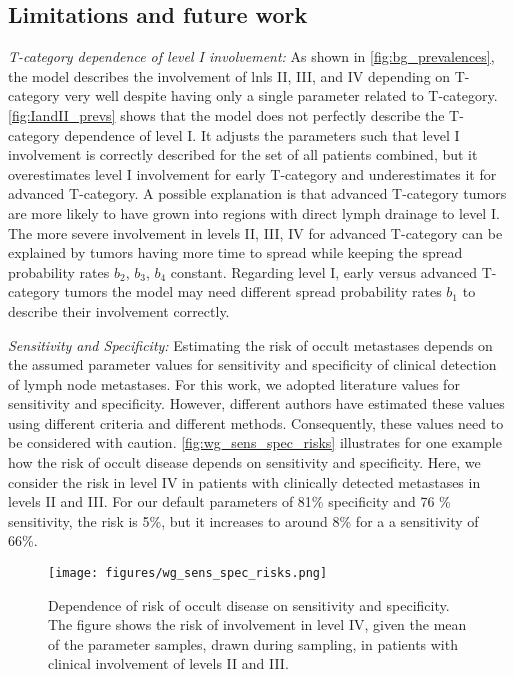 \documentclass[twocolumn]{aastex631}
\begin{document}
\subsection{Limitations and future work}
\label{subsec:disc:limitation}

{\it T-category dependence of level I involvement:} As shown in \autoref{fig:bg_prevalences}, the model describes the involvement of \glspl{lnl} II, III, and IV depending on T-category very well despite having only a single parameter related to T-category. \autoref{fig:IandII_prevs} shows that the model does not perfectly describe the T-category dependence of level I. It adjusts the parameters such that level I involvement is correctly described for the set of all patients combined, but it overestimates level I involvement for early T-category and underestimates it for advanced T-category. A possible explanation is that advanced T-category tumors are more likely to have grown into regions with direct lymph drainage to level I. The more severe involvement in levels II, III, IV for advanced T-category can be explained by tumors having more time to spread while keeping the spread probability rates $b_2$, $b_3$, $b_4$ constant. Regarding level I, early versus advanced T-category tumors the model may need different spread probability rates $b_1$ to describe their involvement correctly.

{\it Sensitivity and Specificity:} Estimating the risk of occult metastases depends on the assumed parameter values for sensitivity and specificity of clinical detection of lymph node metastases. For this work, we adopted literature values for sensitivity and specificity. However, different authors have estimated these values using different criteria and different methods. Consequently, these values need to be considered with caution. \autoref{fig:wg_sens_spec_risks} illustrates for one example how the risk of occult disease depends on sensitivity and specificity. Here, we consider the risk in level IV in patients with clinically detected metastases in levels II and III. For our default parameters of 81\% specificity and 76 \% sensitivity, the risk is 5\%, but it increases to around 8\% for a a sensitivity of 66\%.

\begin{figure}[t]
    \begin{centering}
        \texttt{[image: figures/wg\_sens\_spec\_risks.png]}
        \caption{Dependence of risk of occult disease on sensitivity and specificity. The figure shows the risk of involvement in level IV, given the mean of the parameter samples, drawn during sampling, in patients with clinical involvement of levels II and III. \label{fig:wg_sens_spec_risks}}
    \end{centering}
\end{figure}
\end{document}

